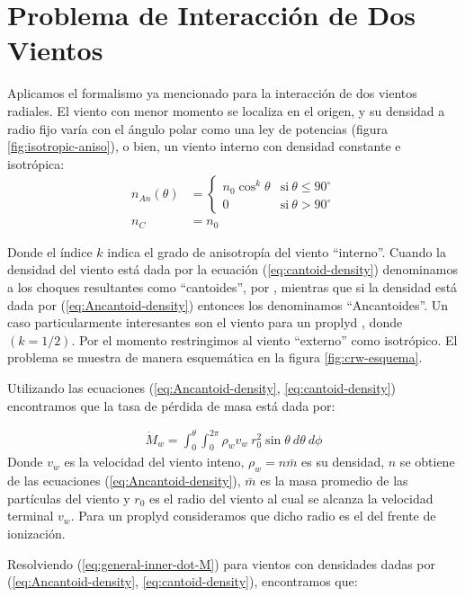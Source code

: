 \section{Problema de Interacción de Dos Vientos}
\label{sec:CRW-2-winds}
Aplicamos el formalismo ya mencionado para la interacción de dos vientos radiales. El viento con menor momento se localiza en el origen, y su densidad a radio fijo varía con el ángulo polar como una ley de potencias (figura \ref{fig:isotropic-aniso}), o bien, un viento interno con densidad constante e isotrópica:
\begin{align}
  n_{An}(\theta) &=\left\lbrace
  \begin{array}{lr}
    n_0\cos^k\theta  & \mathrm{si~}\theta\leq 90^\circ \\
    0 & \mathrm{si~}\theta > 90^\circ
  \end{array}\right. \label{eq:Ancantoid-density}\\
  n_C &= n_0 \label{eq:cantoid-density}
\end{align}

Donde el índice $k$ indica el grado de anisotropía del viento ``interno''. Cuando la densidad del viento está dada por la ecuación (\ref{eq:cantoid-density}) denominamos a los choques resultantes como ``cantoides'', por \citet{Canto:1996}, mientras que si la densidad está dada por (\ref{eq:Ancantoid-density}) entonces los denominamos ``Ancantoides''. Un caso particularmente interesantes son el viento para un proplyd \citep{HA:1998}, donde $(k=1/2)$. Por el momento restringimos al viento ``externo'' como isotrópico. El problema se muestra de manera esquemática en la figura \ref{fig:crw-esquema}.

Utilizando las ecuaciones (\ref{eq:Ancantoid-density}, \ref{eq:cantoid-density}) encontramos que la tasa de pérdida de masa está dada por:

\begin{align}
  \dot{M}_w = \int^\theta_0\int^{2\pi}_0\rho_w v_w~r^2_0\sin\theta~d\theta~d\phi  \label{eq:general-inner-dot-M}
\end{align}
Donde $v_w$ es la velocidad del viento inteno, $\rho_w = n\bar{m}$  es su densidad, $n$ se obtiene de las ecuaciones (\ref{eq:Ancantoid-density}), $\bar{m}$  es la masa promedio de las partículas del viento y $r_0$ es el radio del viento al cual se alcanza la velocidad terminal $v_w$. Para un proplyd consideramos que dicho radio es el del frente de ionización.

Resolviendo (\ref{eq:general-inner-dot-M}) para vientos con densidades dadas por (\ref{eq:Ancantoid-density}, \ref{eq:cantoid-density}), encontramos que:

